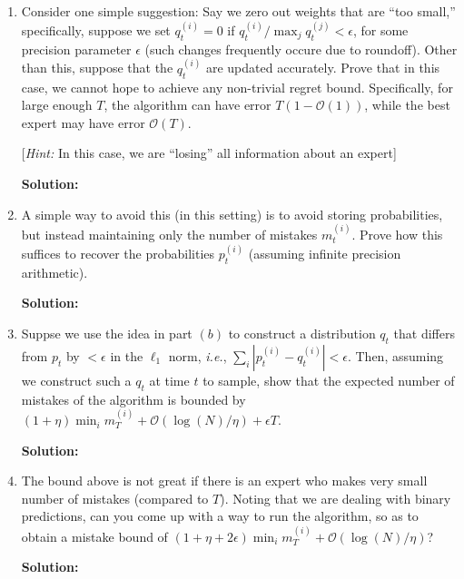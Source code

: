 \documentclass[12pt]{article}
\newcommand{\abs}[1]{\left| #1 \right|}
\newcommand{\BigO}[1]{\mathcal{O}\left( #1 \right)}
\begin{document}
\begin{enumerate}
\begin{enumerate}
  \item Consider one simple suggestion: Say we zero out weights that are ``too small,'' specifically, suppose we set $q_{t}^{(i)} = 0$ if $q_{t}^{(i)}/\max_{j}q_{t}^{(j)} < \epsilon$, for some precision parameter $\epsilon$ (such changes frequently occure due to roundoff). Other than this, suppose that the $q_{t}^{(i)}$ are updated accurately. Prove that in this case, we cannot hope to achieve any non-trivial regret bound. Specifically, for large enough $T$, the algorithm can have error $T(1 - \BigO{1})$, while the best expert may have error $\BigO{T}$.

[{\em Hint:} In this case, we are ``losing'' all information about an expert]

      {\bf Solution:}

\item A simple way to avoid this (in this setting) is to avoid storing probabilities, but instead maintaining only the number of mistakes $m_{t}^{(i)}$. Prove how this suffices to recover the probabilities $p_{t}^{(i)}$ (assuming infinite precision arithmetic).

      {\bf Solution:}

\item Suppse we use the idea in part $(b)$ to construct a distribution $q_{t}$ that differs from $p_{t}$ by $< \epsilon$ in the $\ell_{1}$ norm, {\em i.e.}, $\sum_{i}\abs{p_{t}^{(i)} - q_{t}^{(i)}} < \epsilon$. Then, assuming we construct such a $q_{t}$ at time $t$ to sample, show that the expected number of mistakes of the algorithm is bounded by $(1 + \eta)\min_{i}m_{T}^{(i)} + \BigO{\log(N)/\eta} + \epsilon T$.

      {\bf Solution:}

\item The bound above is not great if there is an expert who makes very small number of mistakes (compared to $T$). Noting that we are dealing with binary predictions, can you come up with a way to run the algorithm, so as to obtain a mistake bound of $\left( 1 + \eta + 2\epsilon\right)\min_{i}m_{T}^{(i)} + \BigO{\log(N)/\eta}$?

      {\bf Solution:}

\end{enumerate}
\end{enumerate}
 
\end{document}
